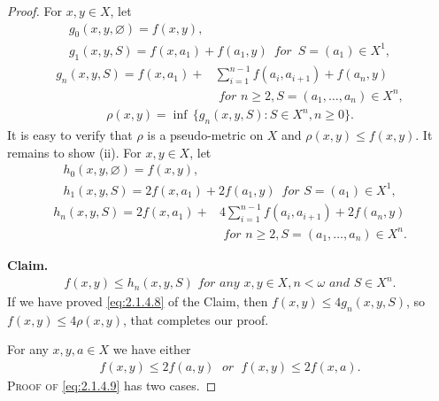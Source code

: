 \documentclass[main.tex]{subfiles}
\begin{document}
\begin{proof} 
	For $x, y\in X$, let
	\begin{gather}
		g_0(x,y,\varnothing) = f(x,y), \label{eq:2.1.4.1}\\
		g_1(x,y,S) = f(x,a_1) + f(a_1,y) \, \textit{ for } \, S = (a_1) \in X^1,  \label{eq:2.1.4.2}
	\end{gather}
	\begin{equation}
		\begin{aligned}
			g_n(x,y,S) =  f(x,a_1) + &\sum_{i=1}^{n-1} f(a_i, a_{i+1}) + f(a_n,y) \\
			& \textit{ for }  n \ge 2, S = (a_1, \ldots, a_n) \in X^n,  \label{eq:2.1.4.3}
		\end{aligned}
	\end{equation}
	\begin{gather}
		\rho(x,y) = \inf \,\{ g_n(x,y,S): S \in X^n, n \ge 0 \}.  \label{eq:2.1.4.4}
	\end{gather}
	It is easy to verify that $\rho$ is a pseudo-metric on $X$ and $\rho(x,y) \le f(x,y)$. It remains to show (ii). For $x, y \in X$, let 
	\begin{gather}
		h_0(x,y,\varnothing) = f(x,y), \label{eq:2.1.4.5}\\
		h_1(x,y,S) = 2f(x,a_1) +2f(a_1,y) \, \textit{ for } S = (a_1) \in X^1, \label{eq:2.1.4.6} 
	\end{gather}
\begin{equation}
		\begin{aligned}
			h_n(x,y,S) = 2f(x,a_1) + & 4 \sum_{i=1}^{n-1} f(a_i, a_{i+1}) + 2f(a_n,y) \\
			& \textit{ for }  n \ge 2, S = (a_1, \ldots, a_n) \in X^n. \label{eq:2.1.4.7}
		\end{aligned}
\end{equation}	

\textbf{Claim.}
\begin{gather}
		f(x,y) \le h_n(x,y,S) \textit{ for any } x, y \in X, n < \omega \textit{ and } S\in X^n. \label{eq:2.1.4.8}
\end{gather}
If we have proved \eqref{eq:2.1.4.8} of the Claim, 
then $f(x,y) \le 4g_n(x,y,S)$, so $f(x,y) \le 4\rho(x,y)$, that completes our proof.
	
For any $x, y, a \in X$ we have either
\begin{gather}
	f(x, y) \le 2 f(a, y)  \; \textit{ or } \; f(x, y) \le 2 f(x, a).  \label{eq:2.1.4.9}
\end{gather}
\textsc{Proof of} \eqref{eq:2.1.4.9} has two cases.
	

\end{proof}
\end{document}
